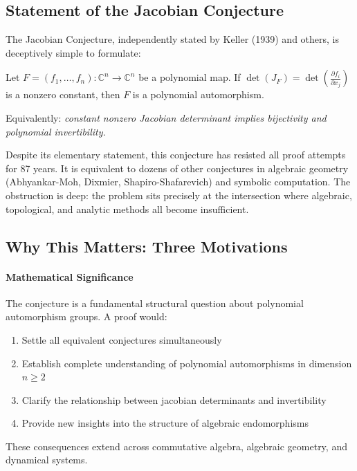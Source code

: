 \documentclass[11pt,a4paper]{article}
\theoremstyle{plain}
\theoremstyle{definition}
\newcommand{\CC}{\mathbb{C}}
\begin{document}
\subsection{Statement of the Jacobian Conjecture}

The Jacobian Conjecture, independently stated by Keller (1939) and others, is deceptively simple to formulate:

\begin{conjecture}
Let $F = (f_1, \ldots, f_n): \CC^n \to \CC^n$ be a polynomial map. If $\det(J_F) = \det\left(\frac{\partial f_i}{\partial x_j}\right)$ is a nonzero constant, then $F$ is a polynomial automorphism.
\end{conjecture}

Equivalently: \textit{constant nonzero Jacobian determinant implies bijectivity and polynomial invertibility.}

Despite its elementary statement, this conjecture has resisted all proof attempts for 87 years. It is equivalent to dozens of other conjectures in algebraic geometry (Abhyankar-Moh, Dixmier, Shapiro-Shafarevich) and symbolic computation. The obstruction is deep: the problem sits precisely at the intersection where algebraic, topological, and analytic methods all become insufficient.

\subsection{Why This Matters: Three Motivations}

\paragraph{Mathematical Significance}

The conjecture is a fundamental structural question about polynomial automorphism groups. A proof would:
\begin{enumerate}
\item Settle all equivalent conjectures simultaneously
\item Establish complete understanding of polynomial automorphisms in dimension $n \geq 2$
\item Clarify the relationship between jacobian determinants and invertibility
\item Provide new insights into the structure of algebraic endomorphisms
\end{enumerate}

These consequences extend across commutative algebra, algebraic geometry, and dynamical systems.
\end{document}
